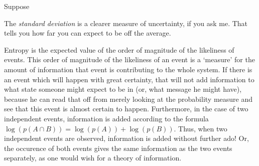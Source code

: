 \documentclass{article}
\begin{document}
\maketitle

\begin{ex}
Suppose 
\end{ex}

\begin{ex}
The \emph{standard deviation} is a clearer measure of uncertainty, if you ask me. That tells you how far you can expect to be off the average. 

Entropy is the expected value of the order of magnitude of the likeliness of events. This order of magnitude of the likeliness of an event is a `measure' for the amount of information that event is contributing to the whole system. If there is an event which will happen with great certainty, that will not add information to what state someone might expect to be in (or, what message he might have), because he can read that off from merely looking at the probability measure and see that this event is almost certain to happen. Furthermore, in the case of two independent events, information is added according to the formula $\log(p(A\cap B))=\log(p(A))+\log(p(B))$. Thus, when two independent events are observed, information is added without further ado! Or, the occurence of both events gives the same information as the two events separately, as one would wish for a theory of information. 
\end{ex}
\end{document}
